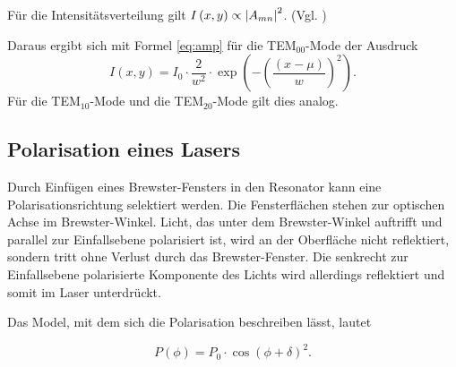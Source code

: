 Für die Intensitätsverteilung gilt $I\left(x,y\right) \propto \absolutevalue{A_{mn}}^2$. (Vgl. \cite{Laserspektroskopie})

Daraus ergibt sich mit Formel \eqref{eq:amp} für die 
TEM$_{00}$-Mode der Ausdruck 
\begin{equation}
    I(x,y) = I_0 \cdot \frac{2}{w^2} \cdot \exp\left(-\left(\frac{(x - \mu)}{w}\right)^2\right).
    \label{eq:mode0}
\end{equation}
Für die TEM$_{10}$-Mode und die TEM$_{20}$-Mode gilt dies analog.










\subsection{Polarisation eines Lasers}
Durch Einfügen eines Brewster-Fensters in den Resonator kann eine Polarisationsrichtung selektiert werden.
Die Fensterflächen stehen  zur optischen Achse im Brewster-Winkel. Licht, das unter dem Brewster-Winkel auftrifft und parallel zur Einfallsebene polarisiert ist, wird an der Oberfläche nicht reflektiert, sondern tritt ohne Verlust durch das Brewster-Fenster. Die senkrecht zur Einfallsebene polarisierte Komponente des Lichts wird allerdings reflektiert und somit im Laser unterdrückt.

Das Model, mit dem sich die Polarisation beschreiben lässt, lautet 

\begin{equation}
    P(\phi) = P_0 \cdot \cos\left( \phi + \delta \right)^2. 
    \label{eq:polar}
\end{equation}
